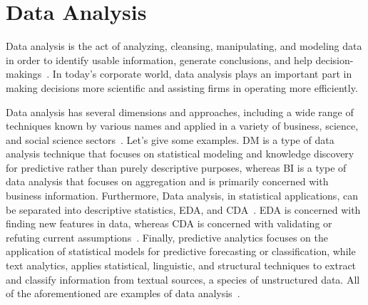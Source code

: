 \section{Data Analysis}
Data analysis is the act of analyzing, cleansing, manipulating, and modeling data in order to identify usable information, generate conclusions, and help decision-makings~\cite{Book:sbrown_2014_transforming}.
In today's corporate world, data analysis plays an important part in making decisions more scientific and assisting firms in operating more efficiently. 

Data analysis has several dimensions and approaches, including a wide range of techniques known by various names and applied in a variety of business, science, and social science sectors~\cite{Book:pruneau_2017}.
Let's give some examples.
\ac{DM} is a type of data analysis technique that focuses on statistical modeling and knowledge discovery for predictive rather than purely descriptive purposes,
whereas \ac{BI} is a type of data analysis that focuses on aggregation and is primarily concerned with business information.
Furthermore, Data analysis, in statistical applications, can be separated into descriptive statistics, \ac{EDA}, and \ac{CDA}~\cite{Book:doing_data_science}. 
\ac{EDA} is concerned with finding new features in data, whereas \ac{CDA} is concerned with validating or refuting current assumptions~\cite{Article:intro_to_data_analysis}.
Finally, predictive analytics focuses on the application of statistical models for predictive forecasting or classification, 
while text analytics, applies statistical, linguistic, and structural techniques to extract and classify information from textual sources, a species of unstructured data.
All of the aforementioned are examples of data analysis~\cite{Article:goodnight_2011_the}.

